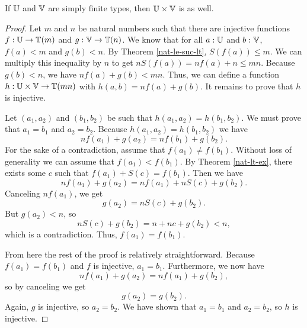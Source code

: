 \documentclass[../math.tex]{subfiles}
\begin{document}
\begin{theorem} \label{simple-finite-prod}
    If $\mathbb{U}$ and $\mathbb{V}$ are simply finite types, then $\mathbb{U} \times \mathbb{V}$ is as well.
\end{theorem}
\begin{proof}
    Let $m$ and $n$ be natural numbers such that there are injective functions
    $f : \mathbb{U} \to \mathbb{T}(m)$ and $g : \mathbb{V} \to \mathbb{T}(n)$.  We know that for all $a : \mathbb{U}$
    and $b : \mathbb{V}$, $f(a) < m$ and $g(b) < n$.  By Theorem \ref{nat-le-suc-lt},
    $S(f(a)) \leq m$.  We can multiply this inequality by $n$ to get $nS(f(a)) =
    nf(a) + n \leq mn$.  Because $g(b) < n$, we have $nf(a) + g(b) < mn$.  Thus,
    we can define a function $h : \mathbb{U} \times \mathbb{V} \to \mathbb{T}(mn)$ with $h(a, b) = nf(a)
    + g(b)$.  It remains to prove that $h$ is injective.

    Let $(a_1, a_2)$ and $(b_1, b_2)$ be such that $h(a_1, a_2) = h(b_1, b_2)$.
    We must prove that $a_1 = b_1$ and $a_2 = b_2$.  Because $h(a_1, a_2) =
    h(b_1, b_2)$ we have
    \[
        nf(a_1) + g(a_2) = nf(b_1) + g(b_2).
    \]
    For the sake of a contradiction, assume that $f(a_1) \neq f(b_1)$.  Without
    loss of generality we can assume that $f(a_1) < f(b_1)$.  By Theorem
    \ref{nat-lt-ex}, there exists some $c$ such that $f(a_1) + S(c) = f(b_1)$.
    Then we have
    \[
        nf(a_1) + g(a_2) = nf(a_1) + nS(c) + g(b_2).
    \]
    Canceling $nf(a_1)$, we get
    \[
        g(a_2) = nS(c) + g(b_2).
    \]
    But $g(a_2) < n$, so
    \[
        nS(c) + g(b_2) = n + nc + g(b_2) < n,
    \]
    which is a contradiction.  Thus, $f(a_1) = f(b_1)$.

    From here the rest of the proof is relatively straightforward.  Because
    $f(a_1) = f(b_1)$ and $f$ is injective, $a_1 = b_1$.  Furthermore, we now
    have
    \[
        nf(a_1) + g(a_2) = nf(a_1) + g(b_2),
    \]
    so by canceling we get
    \[
        g(a_2) = g(b_2).
    \]
    Again, $g$ is injective, so $a_2 = b_2$.  We have shown that $a_1 = b_1$ and
    $a_2 = b_2$, so $h$ is injective.
\end{proof}
\end{document}
